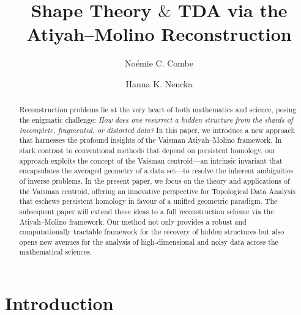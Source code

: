 \documentclass[runningheads]{llncs}
\begin{document}
%
\title{Shape Theory $\&$ TDA via the Atiyah--Molino Reconstruction}
%
%
\author{No\'emie C. Combe \and
Hanna K. Nencka }
%
%
%
\maketitle              %
%
\begin{abstract}

Reconstruction problems lie at the very heart of both mathematics and science, posing the enigmatic challenge: \emph{How does one resurrect a hidden structure from the shards of incomplete, fragmented, or distorted data?} In this paper, we introduce a new approach that harnesses the profound insights of the Vaisman Atiyah--Molino framework. In stark contrast to conventional methods that depend on persistent homology, our approach exploits the concept of the Vaisman centroid—an intrinsic invariant that encapsulates the averaged geometry of a data set—to resolve the inherent ambiguities of inverse problems.  In the present paper, we focus on the theory and applications of the Vaisman centroid, offering an innovative perspective for Topological Data Analysis that eschews persistent homology in favour of a unified geometric paradigm. The subsequent paper will extend these ideas to a full reconstruction scheme via the Atiyah–Molino framework. Our method not only provides a robust and computationally tractable framework for the recovery of hidden structures but also opens new avenues for the analysis of high-dimensional and noisy data across the mathematical sciences.



\end{abstract}
%
%
%
\section{Introduction}
\end{document}
